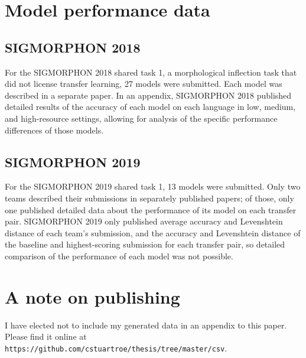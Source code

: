 \section{Model performance data}

\subsection{SIGMORPHON 2018}

For the SIGMORPHON 2018 shared task 1, a morphological inflection task that did not license transfer learning, 27 models were submitted. Each model was described in a separate paper. In an appendix, SIGMORPHON 2018 published detailed results of the accuracy of each model on each language in low, medium, and high-resource settings, allowing for analysis of the specific performance differences of those models.

\subsection{SIGMORPHON 2019}

For the SIGMORPHON 2019 shared task 1, 13 models were submitted. Only two teams described their submissions in separately published papers; of those, only one published detailed data about the performance of its model on each transfer pair. SIGMORPHON 2019 only published average accuracy and Levenshtein distance of each team's submission, and the accuracy and Levenshtein distance of the baseline and highest-scoring submission for each transfer pair, so detailed comparison of the performance of each model was not possible.

\section{A note on publishing}

I have elected not to include my generated data in an appendix to this paper. Please find it online at \texttt{https://github.com/cstuartroe/thesis/tree/master/csv}.